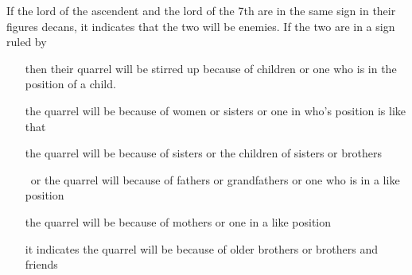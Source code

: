 If the lord of the ascendent and the lord of the 7th are in the same sign in their figures decans, it indicates that the two will be enemies. If the two are in a sign ruled by 
\begin{itemize}[topsep=0em,itemsep=0em]
\item [\Mercury] then their quarrel will be stirred up because of children or one who is in the position of a child. 
\item[\Venus] the quarrel will be because of women or sisters or one in who's position is like that
\item[\Mars] the quarrel will be because of sisters or the children of sisters or brothers
\item[\Saturn\, or \Sun] the quarrel will because of fathers or grandfathers or one who is in a like position
\item[\Moon] the quarrel will be because of mothers or one in a like position
\item[\Jupiter] it indicates the quarrel will be because of older brothers or brothers and friends
\end{itemize}










